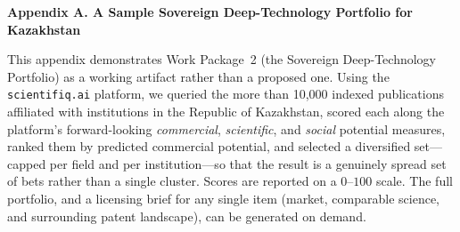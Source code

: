 \documentclass[10pt]{article}
\begin{document}
\begin{center}\Large\bfseries Appendix A. A Sample Sovereign Deep-Technology Portfolio for Kazakhstan\end{center}

\vspace{2pt}
This appendix demonstrates Work Package~2 (the Sovereign Deep-Technology Portfolio)
as a working artifact rather than a proposed one. Using the \texttt{scientifiq.ai}
platform, we queried the more than 10,000 indexed publications affiliated with
institutions in the Republic of Kazakhstan, scored each along the platform's
forward-looking \emph{commercial}, \emph{scientific}, and \emph{social} potential
measures, ranked them by predicted commercial potential, and selected a
diversified set---capped per field and per institution---so that the result is a
genuinely spread set of bets rather than a single cluster. Scores are reported on
a $0$--$100$ scale. The full portfolio, and a licensing brief for any single item
(market, comparable science, and surrounding patent landscape), can be generated
on demand.
\end{document}
